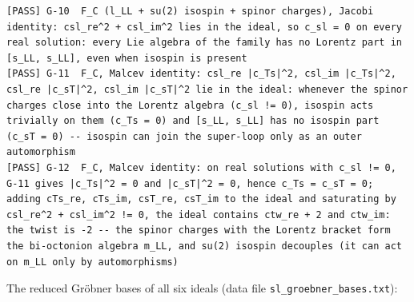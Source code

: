 \documentclass[
  10pt,
]{article}
\begin{document}
\begin{verbatim}
[PASS] G-10  F_C (l_LL + su(2) isospin + spinor charges), Jacobi identity: csl_re^2 + csl_im^2 lies in the ideal, so c_sl = 0 on every real solution: every Lie algebra of the family has no Lorentz part in [s_LL, s_LL], even when isospin is present
[PASS] G-11  F_C, Malcev identity: csl_re |c_Ts|^2, csl_im |c_Ts|^2, csl_re |c_sT|^2, csl_im |c_sT|^2 lie in the ideal: whenever the spinor charges close into the Lorentz algebra (c_sl != 0), isospin acts trivially on them (c_Ts = 0) and [s_LL, s_LL] has no isospin part (c_sT = 0) -- isospin can join the super-loop only as an outer automorphism
[PASS] G-12  F_C, Malcev identity: on real solutions with c_sl != 0, G-11 gives |c_Ts|^2 = 0 and |c_sT|^2 = 0, hence c_Ts = c_sT = 0; adding cTs_re, cTs_im, csT_re, csT_im to the ideal and saturating by csl_re^2 + csl_im^2 != 0, the ideal contains ctw_re + 2 and ctw_im: the twist is -2 -- the spinor charges with the Lorentz bracket form the bi-octonion algebra m_LL, and su(2) isospin decouples (it can act on m_LL only by automorphisms)
\end{verbatim}

The reduced Gröbner bases of all six ideals (data file
\texttt{sl\_groebner\_bases.txt}):
\end{document}
